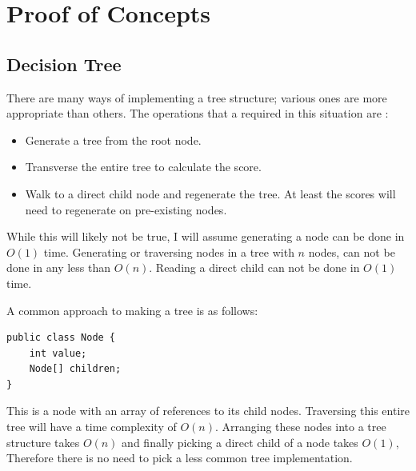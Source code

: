 \documentclass{article}
\begin{document}
\section{Proof of Concepts}
\label{sec:proof_of_concepts}
\subsection{Decision Tree}
\label{subsec:dt}
There are many ways of implementing a tree structure; various ones are more appropriate than others. The operations that a required in this situation are \cite{russell2010artificial}:
\begin{itemize}
    \item Generate a tree from the root node.
    \item Transverse the entire tree to calculate the score.
    \item Walk to a direct child node and regenerate the tree. At least the scores will need to regenerate on pre-existing nodes.
\end{itemize}
While this will likely not be true, I will assume generating a node can be done in $O(1)$ time. Generating or traversing nodes in a tree with $n$ nodes, can not be done in any less than $O(n)$. Reading a direct child can not be done in $O(1)$ time. \par
A common approach to making a tree is as follows:
\begin{verbatim}
public class Node {
    int value;
    Node[] children;
}
\end{verbatim}
This is a node with an array of references to its child nodes. Traversing this entire tree will have a time complexity of 
$O(n)$. Arranging these nodes into a tree structure takes $O(n)$ and finally picking a direct child of a node takes $O(1)$,
Therefore there is no need to pick a less common tree implementation.
\end{document}
